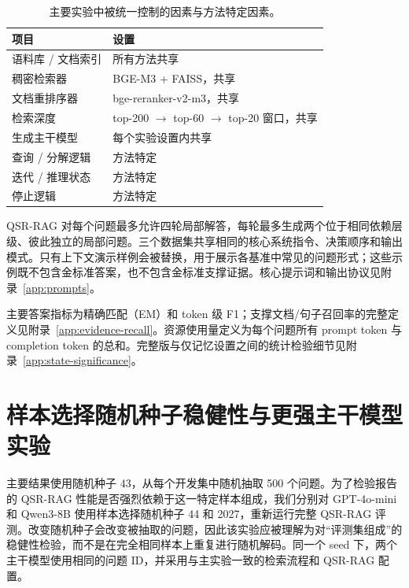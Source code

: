 \documentclass[11pt]{article}
\begin{document}
	\begin{table}[t]
		\centering
		\caption{主要实验中被统一控制的因素与方法特定因素。}
		\label{tab:baseline-control}
		\small
		\setlength{\tabcolsep}{3.2pt}
		\begin{tabular}{p{}p{}}
			\toprule
			项目 & 设置 \\
			\midrule
			语料库 / 文档索引 & 所有方法共享 \\
			稠密检索器 & BGE-M3 + FAISS，共享 \\
			文档重排序器 & bge-reranker-v2-m3，共享 \\
			检索深度 & top-200 $\rightarrow$ top-60 $\rightarrow$ top-20 窗口，共享 \\
			生成主干模型 & 每个实验设置内共享 \\
			查询 / 分解逻辑 & 方法特定 \\
			迭代 / 推理状态 & 方法特定 \\
			停止逻辑 & 方法特定 \\
			\bottomrule
		\end{tabular}
	\end{table}

	QSR-RAG 对每个问题最多允许四轮局部解答，每轮最多生成两个位于相同依赖层级、彼此独立的局部问题。三个数据集共享相同的核心系统指令、决策顺序和输出模式。只有上下文演示样例会被替换，用于展示各基准中常见的问题形式；这些示例既不包含金标准答案，也不包含金标准支撑证据。核心提示词和输出协议见附录~\ref{app:prompts}。

	主要答案指标为精确匹配（EM）和 token 级 F1；支撑文档/句子召回率的完整定义见附录~\ref{app:evidence-recall}。资源使用量定义为每个问题所有 prompt token 与 completion token 的总和。完整版与仅记忆设置之间的统计检验细节见附录~\ref{app:state-significance}。



	\section{样本选择随机种子稳健性与更强主干模型实验}
	\label{app:robustness}

	主要结果使用随机种子 43，从每个开发集中随机抽取 500 个问题。为了检验报告的 QSR-RAG 性能是否强烈依赖于这一特定样本组成，我们分别对 GPT-4o-mini 和 Qwen3-8B 使用样本选择随机种子 44 和 2027，重新运行完整 QSR-RAG 评测。改变随机种子会改变被抽取的问题，因此该实验应被理解为对“评测集组成”的稳健性检验，而不是在完全相同样本上重复进行随机解码。同一个 seed 下，两个主干模型使用相同的问题 ID，并采用与主实验一致的检索流程和 QSR-RAG 配置。
\end{document}
